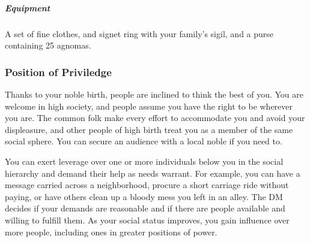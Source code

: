     \subparagraph{Equipment} A set of fine clothes, and signet ring with your family's sigil, and a purse containing 25 agnomas.

    \subsubsection{Position of Priviledge}
        Thanks to your noble birth, people are inclined to think the best of you.
        You are welcome in high society, and people assume you have the right to be wherever you are.
        The common folk make every effort to accommodate you and avoid your displeasure, and other people of high birth treat you as a member of the same social sphere.
        You can secure an audience with a local noble if you need to.

        \thispagestyle{empty}

        \newpage

        You can exert leverage over one or more individuals below you in the social hierarchy and demand their help as needs warrant.
        For example, you can have a message carried across a neighborhood, procure a short carriage ride without paying, or have others clean up a bloody mess you left in an alley.
        The DM decides if your demands are reasonable and if there are people available and willing to fulfill them.
        As your social status improves, you gain influence over more people, including ones in greater positions of power.

